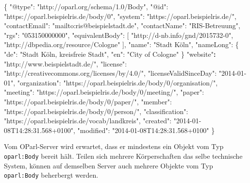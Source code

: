 \documentclass[,a4paper]{article}
\newenvironment{Shaded}{}{}
\newcommand{\DataTypeTok}[1]{\textcolor[rgb]{0.56,0.13,0.00}{{#1}}}
\newcommand{\StringTok}[1]{\textcolor[rgb]{0.25,0.44,0.63}{{#1}}}
\newcommand{\OtherTok}[1]{\textcolor[rgb]{0.00,0.44,0.13}{{#1}}}
\newcommand{\FunctionTok}[1]{\textcolor[rgb]{0.02,0.16,0.49}{{#1}}}
\newcommand{\ErrorTok}[1]{\textcolor[rgb]{1.00,0.00,0.00}{\textbf{{#1}}}}
\begin{document}
\begin{Shaded}
\begin{Highlighting}[]
\FunctionTok{\{}
    \DataTypeTok{"@type"}\FunctionTok{:} \StringTok{"http://oparl.org/schema/1.0/Body"}\FunctionTok{,}
    \DataTypeTok{"@id"}\FunctionTok{:} \StringTok{"https://oparl.beispielris.de/body/0"}\FunctionTok{,}
    \DataTypeTok{"system"}\FunctionTok{:} \StringTok{"https://oparl.beispielris.de/"}\FunctionTok{,}
    \DataTypeTok{"contactEmail"}\FunctionTok{:} \StringTok{"mailto:ris@beispielstadt.de"}\FunctionTok{,}
    \DataTypeTok{"contactName"}\FunctionTok{:} \StringTok{"RIS-Betreuung"}\FunctionTok{,}
    \DataTypeTok{"rgs"}\FunctionTok{:} \StringTok{"053150000000"}\FunctionTok{,}
    \DataTypeTok{"equivalentBody"}\FunctionTok{:} \OtherTok{[}
        \StringTok{"http://d-nb.info/gnd/2015732-0"}\OtherTok{,}
        \StringTok{"http://dbpedia.org/resource/Cologne"}
    \OtherTok{]}\FunctionTok{,}
    \DataTypeTok{"name"}\FunctionTok{:} \StringTok{"Stadt Köln"}\FunctionTok{,}
    \DataTypeTok{"nameLong"}\FunctionTok{:} \FunctionTok{\{}
        \DataTypeTok{"de"}\FunctionTok{:} \StringTok{"Stadt Köln, kreisfreie Stadt"}\FunctionTok{,}
        \DataTypeTok{"en"}\FunctionTok{:} \StringTok{"City of Cologne"}
    \FunctionTok{\}}
    \StringTok{"website"}\ErrorTok{:} \StringTok{"http://www.beispielstadt.de/"}\FunctionTok{,}
    \DataTypeTok{"license"}\FunctionTok{:} \StringTok{"http://creativecommons.org/licenses/by/4.0/"}\FunctionTok{,}
    \DataTypeTok{"licenseValidSinceDay"}\FunctionTok{:} \StringTok{"2014-01-01"}\FunctionTok{,}
    \DataTypeTok{"organization"}\FunctionTok{:} \StringTok{"https://oparl.beispielris.de/body/0/organisation/"}\FunctionTok{,}
    \DataTypeTok{"meeting"}\FunctionTok{:} \StringTok{"https://oparl.beispielris.de/body/0/meeting/"}\FunctionTok{,}
    \DataTypeTok{"paper"}\FunctionTok{:} \StringTok{"https://oparl.beispielris.de/body/0/paper/"}\FunctionTok{,}
    \DataTypeTok{"member"}\FunctionTok{:} \StringTok{"https://oparl.beispielris.de/body/0/person/"}\FunctionTok{,}
    \DataTypeTok{"classification"}\FunctionTok{:} \StringTok{"https://oparl.beispielris.de/vocab/landkreis"}\FunctionTok{,}
    \DataTypeTok{"created"}\FunctionTok{:} \StringTok{"2014-01-08T14:28:31.568+0100"}\FunctionTok{,}
    \DataTypeTok{"modified"}\FunctionTok{:} \StringTok{"2014-01-08T14:28:31.568+0100"}
\FunctionTok{\}}
\end{Highlighting}
\end{Shaded}

Vom OParl-Server wird erwartet, dass er mindestens ein Objekt vom Typ
\texttt{oparl:Body} bereit hält. Teilen sich mehrere Körperschaften das
selbe technische System, können auf demselben Server auch mehrere
Objekte vom Typ \texttt{oparl:Body} beherbergt werden.
\end{document}
